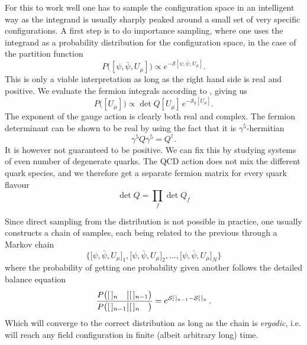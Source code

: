 For this to work well one has to sample the configuration space in an
intelligent way as the integrand is usually sharply peaked around a small set of
very specific configurations. A first step is to do importance sampling, where
one uses the integrand as a probability distribution for the configuration
space, in the case of the partition function
%
\begin{equation}
  P\big([\psi,\bar{\psi}, U_{\mu}]\big) \propto e^{-\mathcal{S}[\psi,\bar{\psi}, U_{\mu}]}.
\end{equation}
%
This is only a viable interpretation as long as the right hand side is real and
positive. We evaluate the fermion integrals according to
, giving us
%
\begin{equation}
  P\big([U_{\mu}]\big) \propto \det Q[U_{\mu}] \, e^{-\mathcal{S}_g[U_{\mu}]}.
\end{equation}
%
The exponent of the gauge action is clearly both real and complex. The fermion
determinant can be shown to be real by using the fact that it is
$\gamma^5$-hermitian
%
\begin{equation}
  \gamma^5 Q \gamma^5 = Q^{\dagger}.
\end{equation}
%
It is however not guaranteed to be positive. We can fix this by studying systems
of even number of degenerate quarks. The QCD action does not mix the different
quark species, and we therefore get a separate fermion matrix for every quark
flavour
%
\begin{equation}
  \det Q = \prod_f \det Q_f
\end{equation}


Since direct sampling from the distribution is not possible in practice,
one usually constructs a chain of samples, each being related to the previous
through a Markov chain
%
\begin{equation}
  \Big\{
    \big[\psi, \bar{\psi}, U_{\mu}\big]_1, 
    \big[\psi, \bar{\psi}, U_{\mu}\big]_2, ..., 
    \big[\psi, \bar{\psi}, U_{\mu}\big]_N
  \Big\}
\end{equation}
%
where the probability of getting one probability given another follows the
detailed balance equation
%
\begin{equation}
  \frac{%
    P\big([\,]_{n\hphantom{-1}} \big| [\,]_{n-1}\big)
  }{%
    P\big([\,]_{n-1} \big| [\,]_{n\hphantom{-1}}\big)
  } = e^{\mathcal{S}[\,]_{n-1} - \mathcal{S}[\,]_n} \,.
\end{equation}
%
Which will converge to the correct distribution as long as the chain is
\emph{ergodic}, i.e. will reach any field configuration in finite (albeit
arbitrary long) time.

